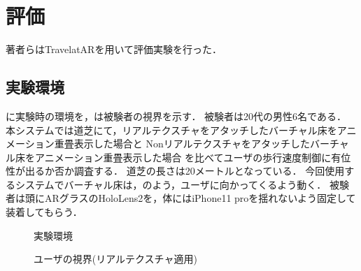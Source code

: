 \chapter{評価}
著者らはTravelatARを用いて評価実験を行った．
\section{実験環境}
に実験時の環境を，は被験者の視界を示す．
被験者は20代の男性6名である．
本システムでは道芝\cite{siba}にて，リアルテクスチャをアタッチしたバーチャル床をアニメーション重畳表示した場合と
Nonリアルテクスチャをアタッチしたバーチャル床をアニメーション重畳表示した場合
を比べてユーザの歩行速度制御に有位性が出るか否か調査する．
道芝の長さは20メートルとなっている．
今回使用するシステムでバーチャル床は，のよう，ユーザに向かってくるよう動く．
被験者は頭にARグラスのHoloLens2を，体にはiPhone11 proを揺れないよう固定して装着してもらう\cite{holo}\cite{ipon}．
\begin{figure}[H]
    \centering
    \caption{実験環境}
    \label{fig:env}
\end{figure}
\begin{figure}[H]
    \centering
    \caption{ユーザの視界(リアルテクスチャ適用)}
    \label{fig:siten}
\end{figure}
